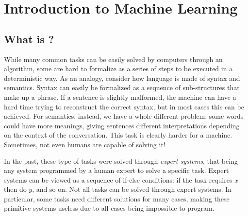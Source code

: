 \documentclass[a4paper, 12pt]{report}
\institute{\curlyquotes{\hspace{0.25mm}Sapienza} Università di Roma}
\subtitle{Appunti integrati con il libro \book}
\author{\textit{Autore}\\\authorName}
\institute{\curlyquotes{\hspace{0.25mm}Sapienza} University of Rome}
\subtitle{Lecture notes integrated with the book \book}
\author{\textit{Author}\\\authorName}
\title{\courseName}
\date{\today}
\begin{document}
    \maketitle

    {
        \hypersetup{allcolors=black}

        \romantableofcontents
    }

    \introduction


    \chapter{Introduction to Machine Learning}

    \section{What is ?}

    While many common tasks can be easily solved by computers through an algorithm, some are hard to formalize as a series of steps to be executed in a deterministic way. As an analogy, consider how language is made of syntax and semantics. Syntax can easily be formalized as a sequence of sub-structures that make up a phrase. If a sentence is slightly malformed, the machine can have a hard time trying to reconstruct the correct syntax, but in most cases this can be achieved. For semantics, instead, we have a whole different problem: some words could have more meanings, giving sentences different interpretations depending on the context of the conversation. This task is clearly harder for a machine. Sometimes, not even humans are capable of solving it!

    In the past, these type of tasks were solved through \textit{expert systems}, that being any system programmed by a human expert to solve a specific task. Expert systems can be viewed as a sequence of if-else conditions: if the task requires $x$ then do $y$, and so on. Not all tasks can be solved through expert systems. In particular, some tasks need different solutions for many cases, making these primitive systems useless due to all cases being impossible to program.
\end{document}

